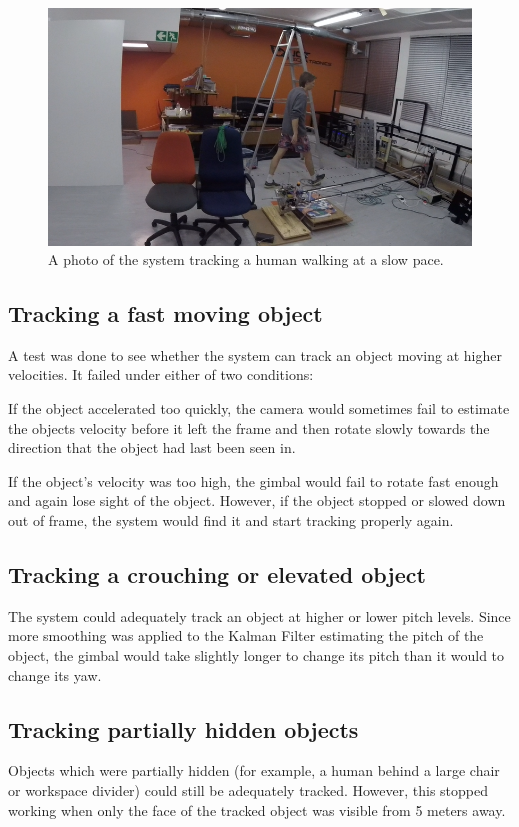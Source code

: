 \begin{figure}[h!]
  \centering
  \includegraphics[width=\textwidth]{results/follow_walk_small_delay}
  \caption{\label{fig:follow_walk_small_delay}A photo of the system tracking a human walking at a slow pace.}
\end{figure}

\subsection{Tracking a fast moving object}
A test was done to see whether the system can track an object moving at higher velocities. It failed under either of two conditions:

If the object accelerated too quickly, the camera would sometimes fail to estimate the objects velocity before it left the frame and then rotate slowly towards the direction that the object had last been seen in.

If the object's velocity was too high, the gimbal would fail to rotate fast enough and again lose sight of the object. However, if the object stopped or slowed down out of frame, the system would find it and start tracking properly again.


\subsection{Tracking a crouching or elevated object}
The system could adequately track an object at higher or lower pitch levels. Since more smoothing was applied to the Kalman Filter estimating the pitch of the object, the gimbal would take slightly longer to change its pitch than it would to change its yaw.


\subsection{Tracking partially hidden objects}
Objects which were partially hidden (for example, a human behind a large chair or workspace divider) could still be adequately tracked. However, this stopped working when only the face of the tracked object was visible from 5 meters away.


